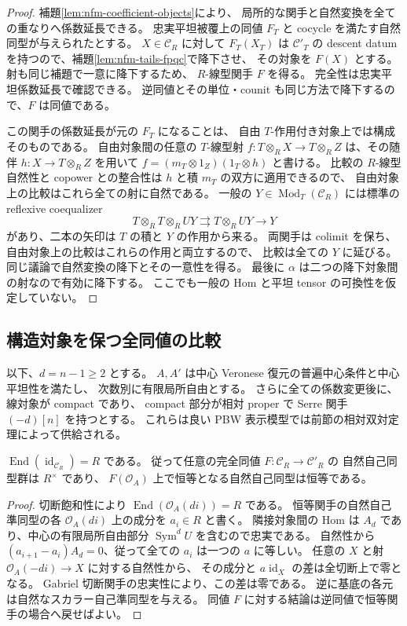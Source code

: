 \begin{proof}
補題\ref{lem:nfm-coefficient-objects}により、
局所的な関手と自然変換を全ての重なりへ係数延長できる。
忠実平坦被覆上の同値 $F_T$ と cocycle を満たす自然同型が与えられたとする。
$X\in\mathcal C_R$ に対して $F_T(X_T)$ は $\mathcal C'_T$ の
descent datum を持つので、補題\ref{lem:nfm-tails-fpqc}で降下させ、
その対象を $F(X)$ とする。射も同じ補題で一意に降下するため、
$R$-線型関手 $F$ を得る。
完全性は忠実平坦係数延長で確認できる。
逆同値とその単位・counit も同じ方法で降下するので、$F$ は同値である。

この関手の係数延長が元の $F_T$ になることは、
自由 $T$-作用付き対象上では構成そのものである。
自由対象間の任意の $T$-線型射
$f:T\otimes_RX\to T\otimes_RZ$ は、その随伴
$h:X\to T\otimes_RZ$ を用いて
$f=(m_T\otimes1_Z)(1_T\otimes h)$ と書ける。
比較の $R$-線型自然性と copower との整合性は $h$ と積 $m_T$ の双方に適用できるので、
自由対象上の比較はこれら全ての射に自然である。
一般の $Y\in\operatorname{Mod}_T(\mathcal C_R)$ には標準の reflexive coequalizer
\[
 T\otimes_RT\otimes_RUY
 \rightrightarrows T\otimes_RUY\longrightarrow Y
\]
があり、二本の矢印は $T$ の積と $Y$ の作用から来る。
両関手は colimit を保ち、自由対象上の比較はこれらの作用と両立するので、
比較は全ての $Y$ に延びる。
同じ議論で自然変換の降下とその一意性を得る。
最後に $\alpha$ は二つの降下対象間の射なので有効に降下する。
ここでも一般の Hom と平坦 tensor の可換性を仮定していない。
\end{proof}

\subsection{構造対象を保つ全同値の比較}

以下、$d=n-1\ge2$ とする。
$A,A'$ は中心 Veronese 復元の普遍中心条件と中心平坦性を満たし、
次数別に有限局所自由とする。
さらに全ての係数変更後に、線対象が compact であり、
compact 部分が相対 proper で Serre 関手 $(-d)[n]$ を持つとする。
これらは良い PBW 表示模型では前節の相対双対定理によって供給される。

\begin{lemma}[自然自己同型のスカラー性]
\label{lem:nfm-natural-scalars}
$\operatorname{End}(\operatorname{id}_{\mathcal C_R})=R$ である。
従って任意の完全同値 $F:\mathcal C_R\to\mathcal C'_R$ の
自然自己同型群は $R^\times$ であり、
$F(\mathcal O_A)$ 上で恒等となる自然自己同型は恒等である。
\end{lemma}

\begin{proof}
切断飽和性により
$\operatorname{End}(\mathcal O_A(di))=R$ である。
恒等関手の自然自己準同型の各 $\mathcal O_A(di)$ 上の成分を
$a_i\in R$ と書く。
隣接対象間の Hom は $A_d$ であり、中心の有限局所自由部分
$\operatorname{Sym}^dU$ を含むので忠実である。
自然性から $(a_{i+1}-a_i)A_d=0$、従って全ての $a_i$ は一つの $a$ に等しい。
任意の $X$ と射 $\mathcal O_A(-di)\to X$ に対する自然性から、
その成分と $a\operatorname{id}_X$ の差は全切断上で零となる。
Gabriel 切断関手の忠実性により、この差は零である。
逆に基底の各元は自然なスカラー自己準同型を与える。
同値 $F$ に対する結論は逆同値で恒等関手の場合へ戻せばよい。
\end{proof}

